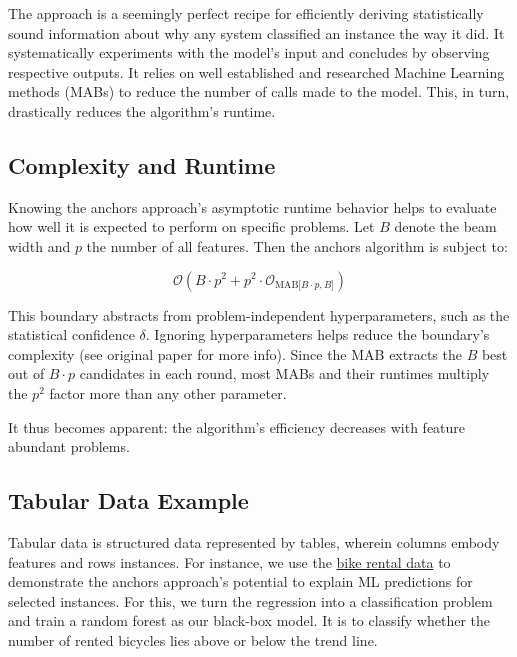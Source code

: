 \documentclass[
  12pt,
]{krantz}
\begin{document}
The approach is a seemingly perfect recipe for efficiently deriving statistically sound information about why any system classified an instance the way it did. It systematically experiments with the model's input and concludes by observing respective outputs. It relies on well established and researched Machine Learning methods (MABs) to reduce the number of calls made to the model. This, in turn, drastically reduces the algorithm's runtime.

\hypertarget{complexity-and-runtime}{%
\subsection{Complexity and Runtime}\label{complexity-and-runtime}}

Knowing the anchors approach's asymptotic runtime behavior helps to evaluate how well it is expected to perform on specific problems. Let \(B\) denote the beam width and \(p\) the number of all features. Then the anchors algorithm is subject to:

\[\mathcal{O}(B\cdot{}p^2+p^2\cdot\mathcal{O}_{\textrm{MAB}\lbrack{}B\cdot{}p,B\rbrack})\]

This boundary abstracts from problem-independent hyperparameters, such as the statistical confidence \(\delta\). Ignoring hyperparameters helps reduce the boundary's complexity (see original paper for more info). Since the MAB extracts the \(B\) best out of \(B \cdot p\) candidates in each round, most MABs and their runtimes multiply the \(p^2\) factor more than any other parameter.

It thus becomes apparent: the algorithm's efficiency decreases with feature abundant problems.

\hypertarget{tabular-data-example}{%
\subsection{Tabular Data Example}\label{tabular-data-example}}

Tabular data is structured data represented by tables, wherein columns embody features and rows instances.
For instance, we use the \protect\hyperlink{bike-data}{bike rental data} to demonstrate the anchors approach's potential to explain ML predictions for selected instances. For this, we turn the regression into a classification problem and train a random forest as our black-box model. It is to classify whether the number of rented bicycles lies above or below the trend line.
\end{document}

